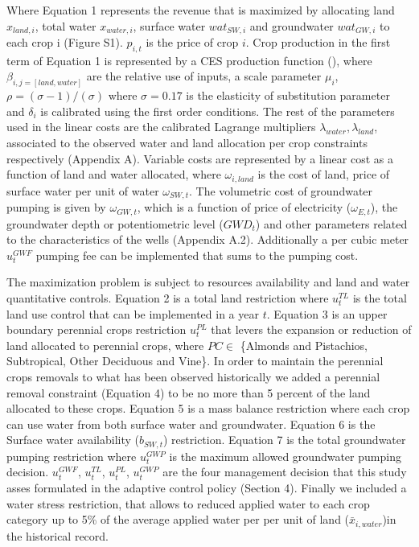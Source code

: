 \documentclass[11pt,a4paper]{article}
\begin{document}
Where Equation 1 represents the revenue that is maximized by allocating land $x_{land,i}$, total water $x_{water,i}$, surface water $wat_{SW,i}$ and groundwater $wat_{GW,i}$ to each crop i (Figure S1). $p_{i,t}$ is the price of crop $i$. Crop production in the first term of Equation 1 is represented by a CES production function (\cite{debertin_agricultural_2012}), where $\beta_{i,j=[land,water]}$ are the relative use of inputs, a scale parameter $\mu_{i}$, $\rho = (\sigma-1)/(\sigma)$ where $\sigma = 0.17$ is the elasticity of substitution parameter and $\delta_{i}$ is calibrated using the first order conditions. The rest of the parameters used in the linear costs are the calibrated Lagrange multipliers $\lambda_{water},\lambda_{land}$, associated to the observed water and land allocation per crop constraints respectively (Appendix A). Variable costs are represented by a linear cost as a function of land and water allocated, where $\omega_{i,land}$ is the cost of land, price of surface water per unit of water $\omega_{SW,t}$. The volumetric cost of groundwater pumping is given by $\omega_{GW,t}$, which is a function of price of electricity ($\omega_{E,t}$), the groundwater depth or potentiometric level ($GWD_t$) and other parameters related to the characteristics of the wells (Appendix A.2). Additionally a per cubic meter $u^{GWF}_{t}$ pumping fee can be implemented that sums to the pumping cost.

The maximization problem is subject to resources availability and land and water quantitative controls. Equation 2 is a total land restriction where $u^{TL}_{t}$ is the total land use control that can be implemented in a year $t$. Equation 3 is an upper boundary perennial crops restriction $u^{PL}_{t}$ that levers the expansion or reduction of land allocated to perennial crops, where $PC \in$ \{Almonds and Pistachios, Subtropical, Other Deciduous and Vine\}. In order to maintain the perennial crops removals to what has been observed historically we added a perennial removal constraint (Equation 4) to be no more than 5 percent of the land allocated to these crops. Equation 5 is a mass balance restriction where each crop can use water from both surface water and groundwater. Equation 6 is the Surface water availability ($b_{SW,t}$) restriction. Equation 7 is the total groundwater pumping restriction where $u^{GWP}_{t}$ is the maximum allowed groundwater pumping decision. $u^{GWF}_{t}$, $u^{TL}_{t}$, $u^{PL}_{t}$, $u^{GWP}_{t}$ are the four management decision that this study asses formulated in the adaptive control policy (Section  4). Finally we included a water stress restriction, that allows to reduced applied water to each crop category up to 5\% of the average applied water per per unit of land ($\bar{x}_{i,water}$)in the historical record.
\end{document}
